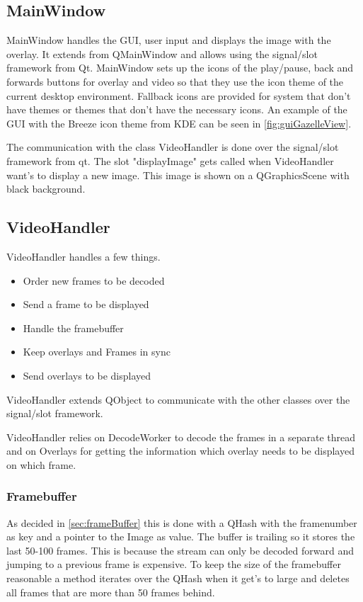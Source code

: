 \subsection{MainWindow}
\label{sec:mainWindow}
MainWindow handles the GUI, user input and displays the image with the overlay. It extends from QMainWindow and allows using the signal/slot framework from Qt. 
MainWindow sets up the icons of the play/pause, back and forwards buttons for overlay and video so that they use the icon theme of the current desktop environment. Fallback icons are provided for system that don't have themes or themes that don't have the necessary icons. An example of the GUI with the Breeze icon theme from KDE can be seen in \ref{fig:guiGazelleView}.

The communication with the class VideoHandler is done over the signal/slot framework from qt. The slot "displayImage" gets called when VideoHandler want's to display a new image. This image is shown on a QGraphicsScene with black background.
\subsection{VideoHandler}
\label{sec:videoHanlder}
VideoHandler handles a few things.
\begin{itemize}
	\item Order new frames to be decoded
	\item Send a frame to be displayed
	\item Handle the framebuffer
	\item Keep overlays and Frames in sync
	\item Send overlays to be displayed
\end{itemize}
VideoHandler extends QObject to communicate with the other classes over the signal/slot framework.

VideoHandler relies on DecodeWorker to decode the frames in a separate thread and on Overlays for getting the information which overlay needs to be displayed on which frame.
\subsubsection{Framebuffer}
\label{sec:framebuffer}
As decided in \ref{sec:frameBuffer} this is done with a QHash with the framenumber as key and a pointer to the Image as value. The buffer is trailing so it stores the last 50-100 frames. This is because the stream can only be decoded forward and jumping to a previous frame is expensive. To keep the size of the framebuffer reasonable a method iterates over the QHash when it get's to large and deletes all frames that are more than 50 frames behind.

